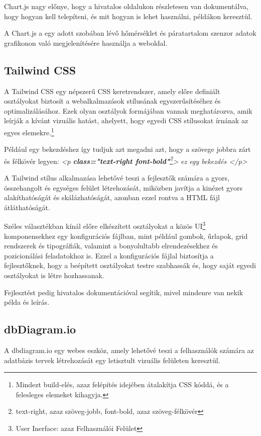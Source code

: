 \documentclass[
]{thesis-ekf}
\theoremstyle{definition}
\theoremstyle{remark}
\begin{document}
	Chart.js nagy előnye, hogy a hivatalos oldalukon részletesen van dokumentálva, hogy hogyan kell telepíteni, és mit hogyan is lehet használni, példákon keresztül.
	
	A Chart.js a egy adott szobában lévő hőmérséklet és páratartalom szenzor adatok grafikonon való megjelenítésére használja a weboldal.
	
	\subsection{Tailwind CSS}\label{tailwind}
	A Tailwind CSS egy népszerű CSS keretrendszer, amely előre definiált osztályokat biztosít a webalkalmazások stílusának egyszerűsítéséhez és optimalizálásához. Ezek olyan osztályok formájában vannak meghatározva, amik leírják a kívánt vizuális hatást, ahelyett, hogy egyedi CSS stílusokat írnának az egyes elemekre.\footnote{Mindezt build-elés, azaz felépítés idejében átalakítja CSS kóddá, és a felesleges elemeket kihagyja.}
	
	Például egy bekezdéshez így tudjuk azt megadni azt, hogy a szövege jobbra zárt és félkövér legyen: \emph{<p \textbf{class="text-right font-bold"}\footnote{text-right, azaz szöveg-jobb, font-bold, azaz szöveg-félkövér}> ez egy bekezdés </p>}
	
	A Tailwind stílus alkalmazása lehetővé teszi a fejlesztők számára a gyors, összehangolt és egységes felület létrehozását, miközben javítja a kinézet gyors alakíthatóságát és skálázhatóságát, azonban ezzel rontva a HTML fájl átláthatóságát.
	
	Széles választékban kínál előre elkészített osztályokat a közös UI\footnote{User Inerface: azaz Felhasználói Felület} komponensekhez egy konfigurációs fájlban, mint például gombok, űrlapok, grid rendszerek és tipográfiák, valamint a bonyolultabb elrendezésekhez és pozicionálási feladatokhoz is. Ezzel a konfigurációs fájlal biztosítja a fejlesztőknek, hogy a beépített osztályokat testre szabhassák és, hogy saját egyedi osztályokat is létre hozhassanak. 
	
	Fejlesztést pedig hivatalos dokumentációval segítik, mivel mindenre van nekik példa és leírás.\cite{tailwind-docs}
	
	\subsection{dbDiagram.io}
	A dbdiagram.io egy webes eszköz, amely lehetővé teszi a felhasználók számára az adatbázis tervek létrehozását egy letisztult vizuális felületen keresztül. 
	
\end{document}
